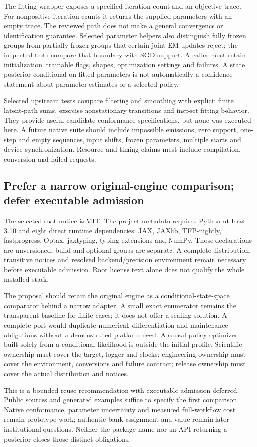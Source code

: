 The fitting wrapper exposes a specified iteration count and an objective trace.
For nonpositive iteration counts it returns the supplied parameters with an
empty trace. The reviewed path does not make a general convergence or
identification guarantee. Selected parameter helpers also distinguish fully
frozen groups from partially frozen groups that certain joint EM updates
reject; the inspected tests compare that boundary with SGD support. A caller
must retain initialization, trainable flags, shapes, optimization settings and
failures. A state posterior conditional on fitted parameters is not automatically
a confidence statement about parameter estimates or a selected policy.
\citep{exec19_dynamax_source}

Selected upstream tests compare filtering and smoothing with explicit finite
latent-path sums, exercise nonstationary transitions and inspect fitting
behavior. They provide useful candidate conformance specifications, but none
was executed here. A future native suite should include impossible emissions,
zero support, one-step and empty sequences, input shifts, frozen parameters,
multiple starts and device synchronization. Resource and timing claims must
include compilation, conversion and failed requests.~\citep{exec19_dynamax_source}

\subsection{Prefer a narrow original-engine comparison; defer executable admission}
\label{exec19:dynamax-choice}

The selected root notice is MIT. The project metadata requires Python at least
3.10 and eight direct runtime dependencies: JAX, JAXlib, TFP-nightly,
fastprogress, Optax, jaxtyping, typing-extensions and NumPy. Those declarations
are unversioned; build and optional groups are separate. A complete distribution,
transitive notices and resolved backend/precision environment remain necessary
before executable admission. Root license text alone does not qualify the whole
installed stack.~\citep{exec19_dynamax_source}

The proposal should retain the original engine as a conditional-state-space
comparator behind a narrow adapter. A small exact enumerator remains the
transparent baseline for finite cases; it does not offer a scaling solution.
A complete port would duplicate numerical, differentiation and maintenance
obligations without a demonstrated platform need. A causal policy optimizer
built solely from a conditional likelihood is outside the initial profile.
Scientific ownership must cover the target, logger and clocks; engineering
ownership must cover the environment, conversions and failure contract; release
ownership must cover the actual distribution and notices.

This is a bounded reuse recommendation with executable admission deferred.
Public sources and generated examples suffice to specify the first comparison.
Native conformance, parameter uncertainty and measured full-workflow cost remain
prototype work; authentic bank assignment and value remain later institutional
questions. Neither the package name nor an API returning a posterior closes
those distinct obligations.
